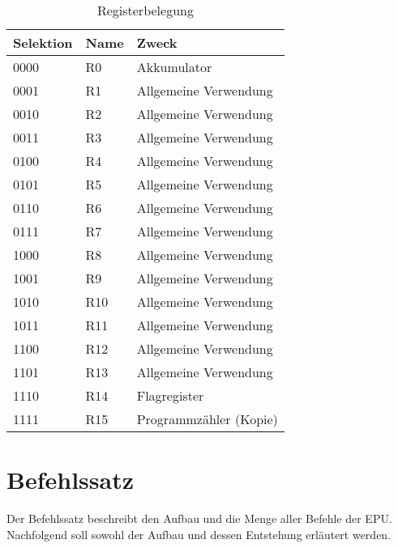 \begin{table}[h]
\centering
\begin{tabular}{lll}
\toprule
Selektion & Name & Zweck\\
\midrule
0000 & R0  & Akkumulator\\
0001 & R1  & Allgemeine Verwendung\\
0010 & R2  & Allgemeine Verwendung\\
0011 & R3  & Allgemeine Verwendung\\
0100 & R4  & Allgemeine Verwendung\\
0101 & R5  & Allgemeine Verwendung\\
0110 & R6  & Allgemeine Verwendung\\
0111 & R7  & Allgemeine Verwendung\\
1000 & R8  & Allgemeine Verwendung\\
1001 & R9  & Allgemeine Verwendung\\
1010 & R10 & Allgemeine Verwendung\\
1011 & R11 & Allgemeine Verwendung\\
1100 & R12 & Allgemeine Verwendung\\
1101 & R13 & Allgemeine Verwendung\\
1110 & R14 & Flagregister\\
1111 & R15 & Programmzähler (Kopie)\\
\bottomrule
\end{tabular}
\caption{Registerbelegung}
\label{tab:registerbelegung}
\end{table}
\pagebreak
\section{Befehlssatz}
\label{s:befehlssatz}
Der Befehlssatz beschreibt den Aufbau und die Menge aller Befehle der \ac{EPU}.
Nachfolgend soll sowohl der Aufbau und dessen Entstehung erläutert werden.

